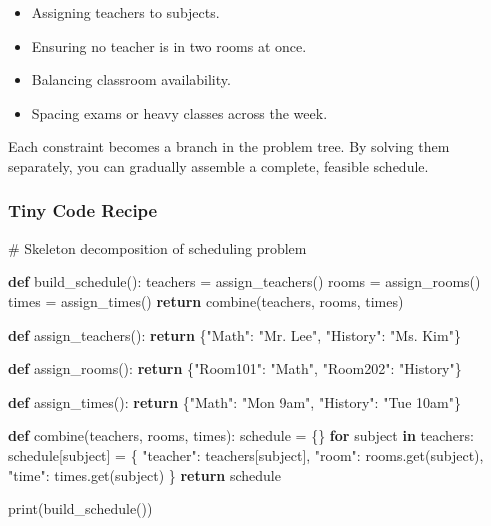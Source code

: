 \documentclass[
  letterpaper,
  DIV=11,
  numbers=noendperiod]{scrreprt}
\newenvironment{Shaded}{\begin{snugshade}}{\end{snugshade}}
\newcommand{\BuiltInTok}[1]{\textcolor[rgb]{0.00,0.23,0.31}{#1}}
\newcommand{\CommentTok}[1]{\textcolor[rgb]{0.37,0.37,0.37}{#1}}
\newcommand{\ControlFlowTok}[1]{\textcolor[rgb]{0.00,0.23,0.31}{\textbf{#1}}}
\newcommand{\KeywordTok}[1]{\textcolor[rgb]{0.00,0.23,0.31}{\textbf{#1}}}
\newcommand{\NormalTok}[1]{\textcolor[rgb]{0.00,0.23,0.31}{#1}}
\newcommand{\OperatorTok}[1]{\textcolor[rgb]{0.37,0.37,0.37}{#1}}
\newcommand{\StringTok}[1]{\textcolor[rgb]{0.13,0.47,0.30}{#1}}
\providecommand{\tightlist}{%
  \setlength{\itemsep}{0pt}\setlength{\parskip}{0pt}}
\begin{document}
\begin{itemize}
\tightlist
\item
  Assigning teachers to subjects.
\item
  Ensuring no teacher is in two rooms at once.
\item
  Balancing classroom availability.
\item
  Spacing exams or heavy classes across the week.
\end{itemize}

Each constraint becomes a branch in the problem tree. By solving them
separately, you can gradually assemble a complete, feasible schedule.

\subsubsection{Tiny Code Recipe}\label{tiny-code-recipe-37}

\begin{Shaded}
\begin{Highlighting}[]
\CommentTok{\# Skeleton decomposition of scheduling problem}

\KeywordTok{def}\NormalTok{ build\_schedule():}
\NormalTok{    teachers }\OperatorTok{=}\NormalTok{ assign\_teachers()}
\NormalTok{    rooms }\OperatorTok{=}\NormalTok{ assign\_rooms()}
\NormalTok{    times }\OperatorTok{=}\NormalTok{ assign\_times()}
    \ControlFlowTok{return}\NormalTok{ combine(teachers, rooms, times)}

\KeywordTok{def}\NormalTok{ assign\_teachers():}
    \ControlFlowTok{return}\NormalTok{ \{}\StringTok{"Math"}\NormalTok{: }\StringTok{"Mr. Lee"}\NormalTok{, }\StringTok{"History"}\NormalTok{: }\StringTok{"Ms. Kim"}\NormalTok{\}}

\KeywordTok{def}\NormalTok{ assign\_rooms():}
    \ControlFlowTok{return}\NormalTok{ \{}\StringTok{"Room101"}\NormalTok{: }\StringTok{"Math"}\NormalTok{, }\StringTok{"Room202"}\NormalTok{: }\StringTok{"History"}\NormalTok{\}}

\KeywordTok{def}\NormalTok{ assign\_times():}
    \ControlFlowTok{return}\NormalTok{ \{}\StringTok{"Math"}\NormalTok{: }\StringTok{"Mon 9am"}\NormalTok{, }\StringTok{"History"}\NormalTok{: }\StringTok{"Tue 10am"}\NormalTok{\}}

\KeywordTok{def}\NormalTok{ combine(teachers, rooms, times):}
\NormalTok{    schedule }\OperatorTok{=}\NormalTok{ \{\}}
    \ControlFlowTok{for}\NormalTok{ subject }\KeywordTok{in}\NormalTok{ teachers:}
\NormalTok{        schedule[subject] }\OperatorTok{=}\NormalTok{ \{}
            \StringTok{"teacher"}\NormalTok{: teachers[subject],}
            \StringTok{"room"}\NormalTok{: rooms.get(subject),}
            \StringTok{"time"}\NormalTok{: times.get(subject)}
\NormalTok{        \}}
    \ControlFlowTok{return}\NormalTok{ schedule}

\BuiltInTok{print}\NormalTok{(build\_schedule())}
\end{Highlighting}
\end{Shaded}
\end{document}
